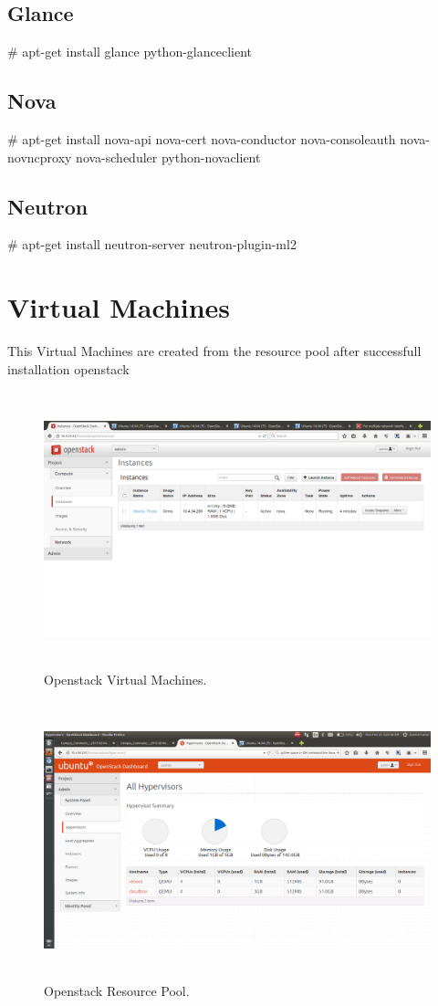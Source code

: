 \documentclass[12pt]{report}
\begin{document}
\subsection{Glance}
\# apt-get install glance python-glanceclient
\subsection{Nova}
\# apt-get install nova-api nova-cert nova-conductor nova-consoleauth nova-novncproxy nova-scheduler python-novaclient
\subsection{Neutron}
\# apt-get install neutron-server neutron-plugin-ml2
\pagebreak
\section{Virtual Machines}
This Virtual Machines are created from the resource pool after successfull installation openstack
\begin{figure}[H]
	\begin{center}
	\includegraphics[width=12cm,height=8cm]{./openstack_2.png}
	\caption{ Openstack Virtual Machines.\label{fig:Openstack Virtual Machines }}
	\end{center}
\end{figure}
\begin{figure}[H]
	\begin{center}
	\includegraphics[width=12cm,height=8cm]{./openstack_3.png}
	\caption{ Openstack Resource Pool.\label{fig:Openstack Resource Pool }}
	\end{center}
\end{figure}
\end{document}
